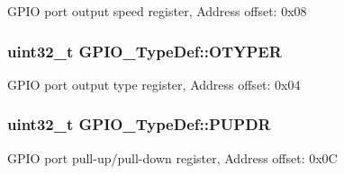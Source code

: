 G\-P\-I\-O port output speed register, Address offset\-: 0x08 \hypertarget{struct_g_p_i_o___type_def_a910885e4d881c3a459dd11640237107f}{
\subsubsection[{O\-T\-Y\-P\-E\-R}]{ uint32\-\_\-t G\-P\-I\-O\-\_\-\-Type\-Def\-::\-O\-T\-Y\-P\-E\-R}}\label{struct_g_p_i_o___type_def_a910885e4d881c3a459dd11640237107f}
G\-P\-I\-O port output type register, Address offset\-: 0x04 \hypertarget{struct_g_p_i_o___type_def_a44ada3bfbe891e2efc1e06bda4c8014e}{
\subsubsection[{P\-U\-P\-D\-R}]{ uint32\-\_\-t G\-P\-I\-O\-\_\-\-Type\-Def\-::\-P\-U\-P\-D\-R}}\label{struct_g_p_i_o___type_def_a44ada3bfbe891e2efc1e06bda4c8014e}
G\-P\-I\-O port pull-\/up/pull-\/down register, Address offset\-: 0x0\-C 

